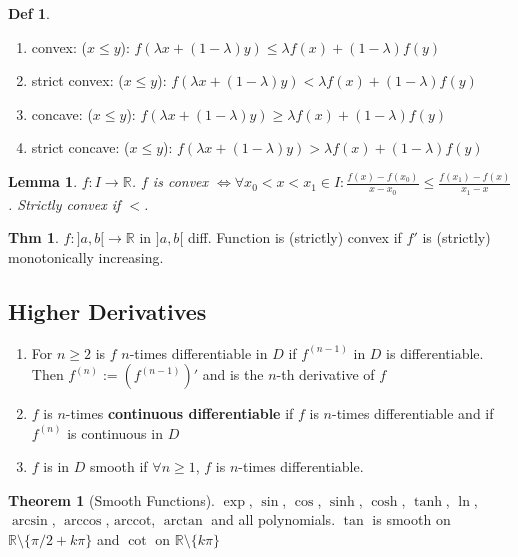 \documentclass[a4paper, 10pt]{article}
\newtheorem*{lemma}{Lemma}
\theoremstyle{definition}
\newtheorem*{theorem}{Thm}
\newtheorem*{definition}{Def}
\theoremstyle{named}
\newtheorem*{ntheorem_wrapper}{Theorem}
\newenvironment{ntheorem}%
    {\begin{mdframed}[style=important]\begin{ntheorem_wrapper}}%
    {\end{ntheorem_wrapper}\end{mdframed}}
\newcommand{\R}{\mathbb{R}}
\begin{document}
\begin{definition}
    \begin{enumerate}
        \item convex: ($x \leq y$): $f (\lambda x + (1 - \lambda)y) \leq \lambda f(x) + (1 - \lambda)f(y)$
        \item strict convex: ($x \leq y$): $f (\lambda x + (1 - \lambda)y) < \lambda f(x) + (1 - \lambda)f(y)$
        \item concave: ($x \leq y$): $f (\lambda x + (1 - \lambda)y) \geq \lambda f(x) + (1 - \lambda)f(y)$
        \item strict concave: ($x \leq y$): $f (\lambda x + (1 - \lambda)y) > \lambda f(x) + (1 - \lambda)f(y)$
    \end{enumerate}
\end{definition}

\begin{lemma}
    $f: I \to \R$. $f$ is convex $\iff \forall x_0 < x < x_1 \in I: \frac{f(x) - f(x_0)}{x - x_0} \leq \frac{f(x_1) - f(x)}{x_1 - x}$. Strictly convex if $<$.
\end{lemma}

\begin{theorem}
    $f: ]a, b[ \to \R$ in $]a, b[$ diff. Function is (strictly) convex if $f'$ is (strictly) monotonically increasing.
\end{theorem}

\subsection{Higher Derivatives}
\begin{enumerate}
    \item For $n \geq 2$ is $f$ $n$-times differentiable in $D$ if $f^{(n-1)}$ in $D$ is differentiable. Then $f^{(n)} := (f^{(n-1)})'$ and is the $n$-th derivative of $f$
    \item $f$ is $n$-times \textbf{continuous differentiable} if $f$ is $n$-times differentiable and if $f^{(n)}$ is continuous in $D$
    \item $f$ is in $D$ smooth if $\forall n \geq 1$, $f$ is $n$-times differentiable.
\end{enumerate}

\begin{ntheorem}[Smooth Functions]
    $\exp$, $\sin$, $\cos$, $\sinh$, $\cosh$, $\tanh$, $\ln$, $\arcsin$, $\arccos$, $\text{arccot}$, $\arctan$ and all polynomials. $\tan$ is smooth on $\R \setminus \{\pi / 2 + k \pi\}$ and $\cot$ on $\R \setminus\{k\pi\}$
\end{ntheorem}
\end{document}
